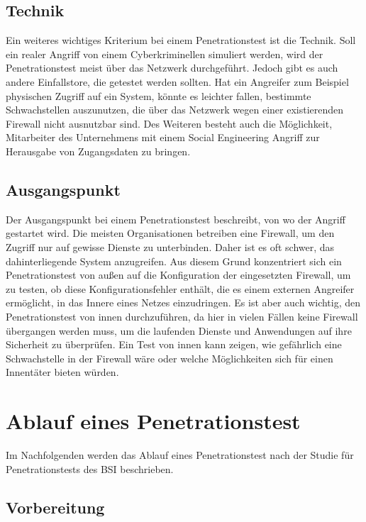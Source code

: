 \subsection{Technik}
Ein weiteres wichtiges Kriterium bei einem Penetrationstest ist die Technik. Soll ein realer Angriff von einem
Cyberkriminellen simuliert werden, wird der Penetrationstest meist über das Netzwerk durchgeführt. Jedoch
gibt es auch andere Einfallstore, die getestet werden sollten. Hat ein Angreifer zum Beispiel physischen Zugriff
auf ein System, könnte es leichter fallen, bestimmte Schwachstellen auszunutzen, die über das Netzwerk wegen einer existierenden Firewall nicht ausnutzbar sind. Des Weiteren besteht auch die Möglichkeit, Mitarbeiter des
Unternehmens mit einem Social Engineering Angriff zur Herausgabe von Zugangsdaten zu bringen.

\subsection{Ausgangspunkt}
Der Ausgangspunkt bei einem Penetrationstest beschreibt, von wo der Angriff gestartet wird. Die meisten
Organisationen betreiben eine Firewall, um den Zugriff nur auf gewisse Dienste zu unterbinden. Daher ist es oft
schwer, das dahinterliegende System anzugreifen. Aus diesem Grund konzentriert sich ein Penetrationstest von
außen auf die Konfiguration der eingesetzten Firewall, um zu testen, ob diese Konfigurationsfehler enthält, die
es einem externen Angreifer ermöglicht, in das Innere eines Netzes einzudringen. Es ist aber auch wichtig, den
Penetrationstest von innen durchzuführen, da hier in vielen Fällen keine Firewall übergangen werden muss, um
die laufenden Dienste und Anwendungen auf ihre Sicherheit zu überprüfen. Ein Test von innen kann zeigen,
wie gefährlich eine Schwachstelle in der Firewall wäre oder welche Möglichkeiten sich für einen Innentäter
bieten würden.

\section{Ablauf eines Penetrationstest}

Im Nachfolgenden werden das Ablauf eines Penetrationstest nach der Studie für Penetrationstests des BSI\cite[100--106]{pt03bsi} beschrieben.

\subsection{Vorbereitung}

